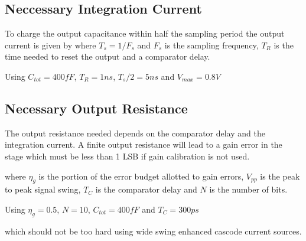\subsection{Neccessary Integration Current}

To charge the output capacitance within half the sampling period the
output current  is given by
where $T_s = 1/F_s$ and $F_s$ is the sampling frequency, $T_R$ is the
time needed to reset the output and a comparator delay.

\begin{exmp} Using $C_{tot} = 400fF$, $T_R = 1ns$, $T_s/2 = 5ns$ and $V_{max} = 0.8V$  

\end{exmp}

\subsection{Necessary Output Resistance}
The output resistance needed depends on the comparator delay and the
integration current. A finite output resistance will lead to a gain
error in the stage which must be less than 1 LSB if gain calibration
is not used. 

where $\eta_g$ is the portion of the error budget allotted to gain
errors, $V_{pp}$ is the peak to peak signal swing, $T_C$ is the
comparator delay and $N$ is the number of bits.

\begin{exmp} Using $\eta_g = 0.5$, $N=10$, $C_{tot} = 400fF$ and $T_C
= 300ps$

\end{exmp}
which should not be too hard using wide swing enhanced cascode current sources.
